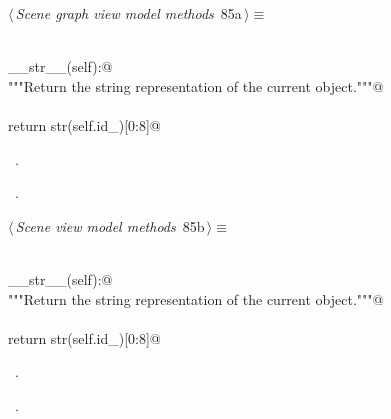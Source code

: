 \documentclass[
    a4paper,      %
    10pt,         %
    openright,    %
    notitlepage,  %
    parskip=half, %
]{scrreprt}       %
\theoremstyle{definition}                    %
\begin{document}
\begin{flushleft} \small
\begin{minipage}{\linewidth}\label{scrap138}\raggedright\small
{} $\langle\,${\itshape Scene graph view model methods}\nobreak\ {\footnotesize {85a}}$\,\rangle\equiv$
\vspace{-1exm}
\begin{list}{}{} \item
\mbox{}\lstinline@@\\
\mbox{}\lstinline@def __str__(self):@\\
\mbox{}\lstinline@    """Return the string representation of the current object."""@\\
\mbox{}\lstinline@@\\
\mbox{}\lstinline@    return str(self.id_)[0:8]@\\
\mbox{}\lstinline@@{\NWsep}
\end{list}
\vspace{-1.5ex}
\footnotesize
\begin{list}{}{\setlength{\itemsep}{-\parsep}\setlength{\itemindent}{-\leftmargin}}
\item \NWtxtMacroDefBy\ .
\item \NWtxtMacroRefIn\ .

\item{}
\end{list}
\end{minipage}\vspace{4ex}
\end{flushleft}
\begin{flushleft} \small
\begin{minipage}{\linewidth}\label{scrap139}\raggedright\small
{} $\langle\,${\itshape Scene view model methods}\nobreak\ {\footnotesize {85b}}$\,\rangle\equiv$
\vspace{-1exm}
\begin{list}{}{} \item
\mbox{}\lstinline@@\\
\mbox{}\lstinline@def __str__(self):@\\
\mbox{}\lstinline@    """Return the string representation of the current object."""@\\
\mbox{}\lstinline@@\\
\mbox{}\lstinline@    return str(self.id_)[0:8]@\\
\mbox{}\lstinline@@{\NWsep}
\end{list}
\vspace{-1.5ex}
\footnotesize
\begin{list}{}{\setlength{\itemsep}{-\parsep}\setlength{\itemindent}{-\leftmargin}}
\item \NWtxtMacroDefBy\ .
\item \NWtxtMacroRefIn\ .

\item{}
\end{list}
\end{minipage}\vspace{4ex}
\end{flushleft}
\end{document}
